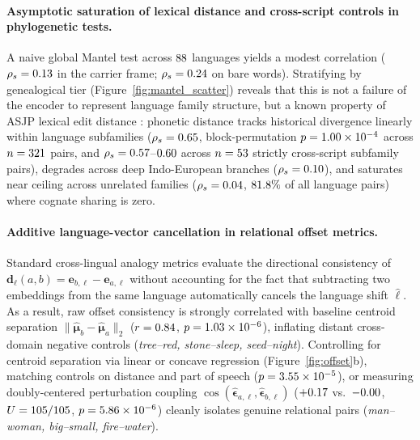 \paragraph{Asymptotic saturation of lexical distance and cross-script controls in phylogenetic tests.}
A naive global Mantel test across $88{}$ languages yields a modest correlation ($\rho_s = 0.13{}$ in the carrier frame; $\rho_s = 0.24{}$ on bare words).
Stratifying by genealogical tier (Figure~\ref{fig:mantel_scatter}) reveals that this is not a failure of the encoder to represent language family structure, but a known property of ASJP lexical edit distance \citep{jaeger2018,wichmann2022}: phonetic distance tracks historical divergence linearly within language subfamilies ($\rho_s = 0.65{}$, block-permutation $p = 1.00 \times 10^{-4}{}$ across $n = 321{}$ pairs, and $\rho_s = 0.57{}$--$0.60{}$ across $n = 53{}$ strictly cross-script subfamily pairs), degrades across deep Indo-European branches ($\rho_s = 0.10{}$), and saturates near ceiling across unrelated families ($\rho_s = 0.04{}$, $81.8{}\%$ of all language pairs) where cognate sharing is zero.

\paragraph{Additive language-vector cancellation in relational offset metrics.}
Standard cross-lingual analogy metrics evaluate the directional consistency of $\mathbf{d}_\ell(a,b) = \mathbf{e}_{b,\ell} - \mathbf{e}_{a,\ell}$ without accounting for the fact that subtracting two embeddings from the same language automatically cancels the language shift $\hat{\boldsymbol{\ell}}$.
As a result, raw offset consistency is strongly correlated with baseline centroid separation $\|\hat{\boldsymbol{\mu}}_b - \hat{\boldsymbol{\mu}}_a\|_2$ ($r = 0.84{}$, $p = 1.03 \times 10^{-6}{}$), inflating distant cross-domain negative controls (\emph{tree--red, stone--sleep, seed--night}).
Controlling for centroid separation via linear or concave regression (Figure~\ref{fig:offset}b), matching controls on distance and part of speech ($p = 3.55 \times 10^{-5}{}$), or measuring doubly-centered perturbation coupling $\cos(\hat{\boldsymbol{\epsilon}}_{a,\ell}, \hat{\boldsymbol{\epsilon}}_{b,\ell})$ ($+0.17{}$ vs.\ $-0.00{}$, $U = 105{}/105$, $p = 5.86 \times 10^{-6}{}$) cleanly isolates genuine relational pairs (\emph{man--woman, big--small, fire--water}).

